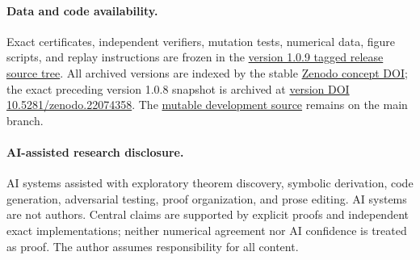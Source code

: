 \documentclass[11pt]{article}
\theoremstyle{definition}
\newcommand{\1}{\mathbf 1}
\begin{document}
\paragraph{Data and code availability.}
Exact certificates, independent verifiers, mutation tests, numerical data,
figure scripts, and replay instructions are frozen in the
\href{https://github.com/AlecKriebel/Math/tree/maximally-collective-stable-turing-v1.0.9/maximally_collective_stable_turing_patterns_binary_complex_mass_action_networks}{version 1.0.9 tagged release source tree}.
All archived versions are indexed by the stable
\href{https://doi.org/10.5281/zenodo.21753404}{Zenodo concept DOI}; the exact
preceding version 1.0.8 snapshot is archived at
\href{https://doi.org/10.5281/zenodo.22074358}{version DOI 10.5281/zenodo.22074358}.
The \href{https://github.com/AlecKriebel/Math/tree/main/maximally_collective_stable_turing_patterns_binary_complex_mass_action_networks}{mutable development source} remains on the main branch.

\paragraph{AI-assisted research disclosure.}
AI systems assisted with exploratory theorem discovery, symbolic derivation,
code generation, adversarial testing, proof organization, and prose editing.
AI systems are not authors.  Central claims are supported by explicit proofs
and independent exact implementations; neither numerical agreement nor AI
confidence is treated as proof.  The author assumes responsibility for all
content.

\begingroup
\renewcommand*{\bibfont}{\footnotesize}
\sloppy
\printbibliography
\endgroup
\end{document}
